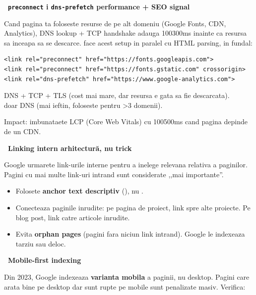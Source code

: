 \begin{bonusbox}
\medskip

\textbf{\faPlug\ \texttt{preconnect} i \texttt{dns-prefetch} \textendash{} performance + SEO signal}

Cand pagina ta foloseste resurse de pe alt domeniu (Google Fonts, CDN, Analytics), DNS lookup + TCP handshake adauga 100\textendash{}300ms inainte ca resursa sa inceapa sa se descarce.  face acest setup in paralel cu HTML parsing, in fundal:

\begin{lstlisting}[style=html, numbers=none]
<link rel="preconnect" href="https://fonts.googleapis.com">
<link rel="preconnect" href="https://fonts.gstatic.com" crossorigin>
<link rel="dns-prefetch" href="https://www.google-analytics.com">
\end{lstlisting}

 \textendash{} DNS + TCP + TLS (cost mai mare, dar resursa e gata sa fie descarcata).\\
 \textendash{} doar DNS (mai ieftin, foloseste pentru \textgreater 3 domenii).

Impact: imbunataete LCP (Core Web Vitals) cu 100\textendash{}500ms cand pagina depinde de un CDN.

\medskip

\textbf{\faLink\ Linking intern \textendash{} arhitectur\u a, nu trick}

Google urmarete link-urile interne pentru a inelege relevana relativa a paginilor. Pagini cu mai multe link-uri intrand sunt considerate ,,mai importante''.

\begin{itemize}[itemsep=1pt]
  \item Folosete \textbf{anchor text descriptiv} (), nu .
  \item Conecteaza paginile inrudite: pe pagina de proiect, link spre alte proiecte. Pe blog post, link catre articole inrudite.
  \item Evita \textbf{orphan pages} (pagini fara niciun link intrand). Google le indexeaza tarziu sau deloc.
\end{itemize}

\medskip

\textbf{\faMobile*\ Mobile-first indexing}

Din 2023, Google indexeaza \textbf{varianta mobila} a paginii, nu desktop. Pagini care arata bine pe desktop dar sunt rupte pe mobile sunt penalizate masiv. Verifica:


\end{bonusbox}
